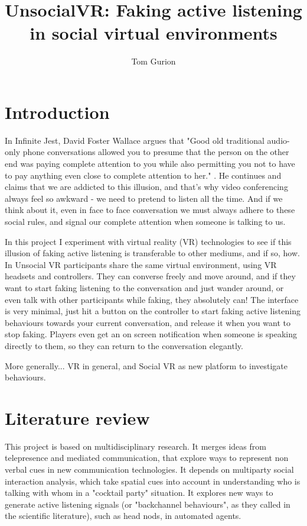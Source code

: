 \documentclass[]{simple-thesis}
\title{UnsocialVR: Faking active listening in social virtual environments}
\author{Tom Gurion}
\affiliation{Media and Arts Technology\\Queen Mary University of London}
\begin{document}
\frontmatter{}  %


\chapter{Introduction}

In Infinite Jest, David Foster Wallace argues that "Good old traditional audio-only phone conversations allowed you to presume that the person on the other end was paying complete attention to you while also permitting you not to have to pay anything even close to complete attention to her." \citep{Wallace1996}.
He continues and claims that we are addicted to this illusion, and that's why video conferencing always feel so awkward - we need to pretend to listen all the time.
And if we think about it, even in face to face conversation we must always adhere to these social rules, and signal our complete attention when someone is talking to us.

In this project I experiment with virtual reality (VR) technologies to see if this illusion of faking active listening is transferable to other mediums, and if so, how.
In Unsocial VR participants share the same virtual environment, using VR headsets and controllers.
They can converse freely and move around, and if they want to start faking listening to the conversation and just wander around, or even talk with other participants while faking, they absolutely can!
The interface is very minimal, just hit a button on the controller to start faking active listening behaviours towards your current conversation, and release it when you want to stop faking.
Players even get an on screen notification when someone is speaking directly to them, so they can return to the conversation elegantly.

More generally...
VR in general, and Social VR as new platform to investigate behaviours.


\chapter{Literature review}

This project is based on multidisciplinary research.
It merges ideas from telepresence and mediated communication, that explore ways to represent non verbal cues in new communication technologies.
It depends on multiparty social interaction analysis, which take spatial cues into account in understanding who is talking with whom in a "cocktail party" situation.
It explores new ways to generate active listening signals (or "backchannel behaviours", as they called in the scientific literature), such as head nods, in automated agents.
\end{document}
